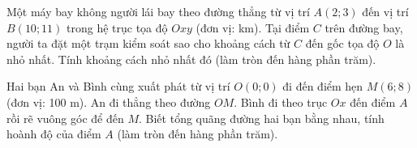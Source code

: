 
\begin{bt}%
	Một máy bay không người lái bay theo đường thẳng từ vị trí $A(2;3)$ đến vị trí $B(10;11)$ trong hệ trục tọa độ $Oxy$ (đơn vị: km). Tại điểm $C$ trên đường bay, người ta đặt một trạm kiểm soát sao cho khoảng cách từ $C$ đến gốc tọa độ $O$ là nhỏ nhất. Tính khoảng cách nhỏ nhất đó (làm tròn đến hàng phần trăm).
	
\end{bt}

\begin{bt}%
	Hai bạn An và Bình cùng xuất phát từ vị trí $O(0;0)$ đi đến điểm hẹn $M(6;8)$ (đơn vị: 100 m). An đi thẳng theo đường $OM$. Bình đi theo trục $Ox$ đến điểm $A$ rồi rẽ vuông góc để đến $M$. Biết tổng quãng đường hai bạn bằng nhau, tính hoành độ của điểm $A$ (làm tròn đến hàng phần trăm).
	
\end{bt}

